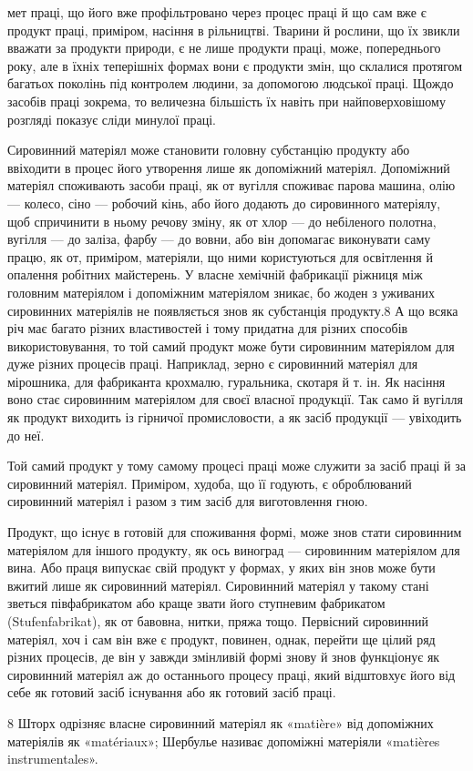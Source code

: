 мет праці, що його вже профільтровано через процес праці й що
сам вже є продукт праці, приміром, насіння в рільництві. Тварини
й рослини, що їх звикли вважати за продукти природи, є не
лише продукти праці, може, попереднього року, але в їхніх теперішніх
формах вони є продукти змін, що склалися протягом
багатьох поколінь під контролем людини, за допомогою людської
праці. Щождо засобів праці зокрема, то величезна більшість їх
навіть при найповерховішому розгляді показує сліди минулої
праці.

Сировинний матеріял може становити головну субстанцію
продукту або ввіходити в процес його утворення лише як допоміжний
матеріял. Допоміжний матеріял споживають засоби праці,
як от вугілля споживає парова машина, олію — колесо, сіно —
робочий кінь, або його додають до сировинного матеріялу, щоб
спричинити в ньому речову зміну, як от хлор — до небіленого
полотна, вугілля — до заліза, фарбу — до вовни, або він допомагає
виконувати саму працю, як от, приміром, матеріяли, що
ними користуються для освітлення й опалення робітних майстерень.
У власне хемічній фабрикації ріжниця між головним матеріялом
і допоміжним матеріялом зникає, бо жоден з уживаних
сировинних матеріялів не появляється знов як субстанція продукту.8
А що всяка річ має багато різних властивостей і тому придатна
для різних способів використовування, то той самий продукт
може бути сировинним матеріялом для дуже різних процесів
праці. Наприклад, зерно є сировинний матеріял для мірошника,
для фабриканта крохмалю, гуральника, скотаря й т. ін. Як
насіння воно стає сировинним матеріялом для своєї власної продукції.
Так само й вугілля як продукт виходить із гірничої промисловости,
а як засіб продукції — увіходить до неї.

Той самий продукт у тому самому процесі праці може служити
за засіб праці й за сировинний матеріял. Приміром, худоба,
що її годують, є оброблюваний сировинний матеріял і разом
з тим засіб для виготовлення гною.

Продукт, що існує в готовій для споживання формі, може знов
стати сировинним матеріялом для іншого продукту, як ось виноград
— сировинним матеріялом для вина. Або праця випускає
свій продукт у формах, у яких він знов може бути вжитий лише
як сировинний матеріял. Сировинний матеріял у такому стані
зветься півфабрикатом або краще звати його ступневим фабрикатом
(Stufenfabrikat), як от бавовна, нитки, пряжа тощо.
Первісний сировинний матеріял, хоч і сам він вже є продукт,
повинен, однак, перейти ще цілий ряд різних процесів, де він
у завжди змінливій формі знову й знов функціонує як сировинний
матеріял аж до останнього процесу праці, який відштовхує
його від себе як готовий засіб існування або як готовий засіб праці.

8  Шторх одрізняє власне сировинний матеріял як «matière» від
допоміжних матеріялів як «matériaux»; Шербулье називає допоміжні
матеріяли «matières instrumentales».
